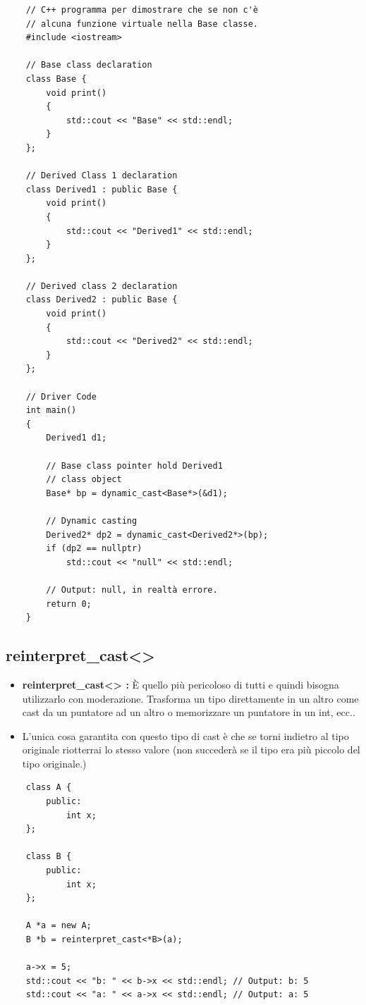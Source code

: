 \begin{lstlisting}
	// C++ programma per dimostrare che se non c'è
	// alcuna funzione virtuale nella Base classe.
	#include <iostream>
	
	// Base class declaration
	class Base {
		void print()
		{
			std::cout << "Base" << std::endl;
		}
	};
	
	// Derived Class 1 declaration
	class Derived1 : public Base {
		void print()
		{
			std::cout << "Derived1" << std::endl;
		}
	};
	
	// Derived class 2 declaration
	class Derived2 : public Base {
		void print()
		{
			std::cout << "Derived2" << std::endl;
		}
	};
	
	// Driver Code
	int main()
	{
		Derived1 d1;
		
		// Base class pointer hold Derived1
		// class object
		Base* bp = dynamic_cast<Base*>(&d1);
		
		// Dynamic casting
		Derived2* dp2 = dynamic_cast<Derived2*>(bp);
		if (dp2 == nullptr)
			std::cout << "null" << std::endl;
			
		// Output: null, in realtà errore.
		return 0;
	}
\end{lstlisting}

\subsection{reinterpret\_cast<>}

\begin{itemize}
	\item \textsf{\small \textbf{reinterpret\_cast<> :} È quello più pericoloso di tutti e quindi bisogna utilizzarlo con moderazione. Trasforma un tipo direttamente in un altro come cast da un puntatore ad un altro o memorizzare un puntatore in un int, ecc..}
	\item \textsf{\small L'unica cosa garantita con questo tipo di cast è che se torni indietro al tipo originale riotterrai lo stesso valore (non succederà se il tipo era più piccolo del tipo originale.)}
\end{itemize}

\begin{lstlisting}
	class A {
		public:
			int x;
	};

	class B {
		public:
			int x;
	};

	A *a = new A;
	B *b = reinterpret_cast<*B>(a);
	
	a->x = 5;
	std::cout << "b: " << b->x << std::endl; // Output: b: 5
	std::cout << "a: " << a->x << std::endl; // Output: a: 5
\end{lstlisting}

